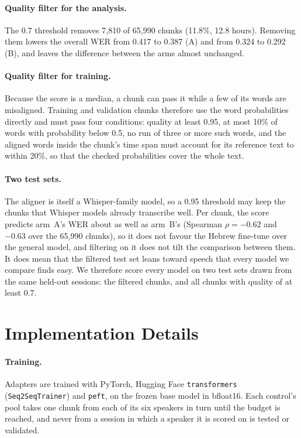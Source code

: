 \documentclass[11pt]{article}
\begin{document}
\paragraph{Quality filter for the analysis.}
The 0.7 threshold removes 7{,}810 of 65{,}990 chunks (11.8\%, 12.8 hours).
Removing them lowers the overall WER from 0.417 to 0.387 (A) and from 0.324 to
0.292 (B), and leaves the difference between the arms almost unchanged.

\paragraph{Quality filter for training.}
Because the score is a median, a chunk can pass it while a few of its words
are misaligned. Training and validation chunks therefore use the word
probabilities directly and must pass four conditions: quality at least 0.95,
at most 10\% of words with probability below 0.5, no run of three or more such
words, and the aligned words inside the chunk's time span must account for its
reference text to within 20\%, so that the checked probabilities cover the whole
text.

\paragraph{Two test sets.}
The aligner is itself a Whisper-family model, so a 0.95 threshold may keep the
chunks that Whisper models already transcribe well. Per chunk, the score
predicts arm~A's WER about as well as arm~B's (Spearman $\rho=-0.62$ and $-0.63$
over the 65{,}990 chunks), so it does not favour the Hebrew fine-tune over the
general model, and filtering on it does not tilt the comparison between them.
It does mean that the filtered test set leans toward speech that every model we compare finds
easy. We therefore score every model on two test sets drawn from the same
held-out sessions: the filtered chunks, and all chunks with quality of at
least 0.7.

\section{Implementation Details}
\label{app:implementation}

\paragraph{Training.}
Adapters are trained with PyTorch, Hugging Face \texttt{transformers}
(\texttt{Seq2SeqTrainer}) and \texttt{peft}, on the frozen base model in
bfloat16. Each control's pool takes
one chunk from each of its six speakers in turn until the budget is reached,
and never from a session in which a speaker it is scored on is tested or
validated.
\end{document}
